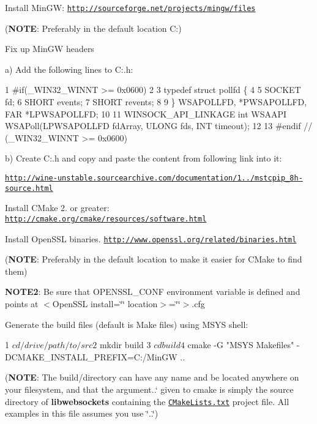 \begin{DoxyEnumerate}
\item Install Min\+GW\+: \href{http://sourceforge.net/projects/mingw/files}{\tt http\+://sourceforge.\+net/projects/mingw/files}

({\bfseries N\+O\+TE}\+: Preferably in the default location C\+:)
\item Fix up Min\+GW headers

a) Add the following lines to C\+:.h\+: 
\begin{DoxyCode}
1 #if(\_WIN32\_WINNT >= 0x0600)
2 
3 typedef struct pollfd \{
4 
5         SOCKET  fd;
6         SHORT   events;
7         SHORT   revents;
8 
9 \} WSAPOLLFD, *PWSAPOLLFD, FAR *LPWSAPOLLFD;
10 
11 WINSOCK\_API\_LINKAGE int WSAAPI WSAPoll(LPWSAPOLLFD fdArray, ULONG fds, INT timeout);
12 
13 #endif // (\_WIN32\_WINNT >= 0x0600)
\end{DoxyCode}
 b) Create C\+:.h and copy and paste the content from following link into it\+:

\href{http://wine-unstable.sourcearchive.com/documentation/1.1.32/mstcpip_8h-source.html}{\tt http\+://wine-\/unstable.\+sourcearchive.\+com/documentation/1../mstcpip\+\_\+8h-\/source.\+html}
\item Install C\+Make 2. or greater\+: \href{http://cmake.org/cmake/resources/software.html}{\tt http\+://cmake.\+org/cmake/resources/software.\+html}
\item Install Open\+S\+SL binaries. \href{http://www.openssl.org/related/binaries.html}{\tt http\+://www.\+openssl.\+org/related/binaries.\+html}

({\bfseries N\+O\+TE}\+: Preferably in the default location to make it easier for C\+Make to find them)

{\bfseries N\+O\+T\+E2}\+: Be sure that O\+P\+E\+N\+S\+S\+L\+\_\+\+C\+O\+NF environment variable is defined and points at $<$\+Open\+S\+S\+L install=\char`\"{}\char`\"{} location$>$=\char`\"{}\char`\"{}$>$.cfg
\item Generate the build files (default is Make files) using M\+S\+YS shell\+: 
\begin{DoxyCode}
1 $ cd /drive/path/to/src
2 $ mkdir build
3 $ cd build
4 $ cmake -G "MSYS Makefiles" -DCMAKE\_INSTALL\_PREFIX=C:/MinGW ..
\end{DoxyCode}
 ({\bfseries N\+O\+TE}\+: The {\ttfamily build/}{\ttfamily directory can have any name and be located anywhere on your filesystem, and that the argument}..` given to cmake is simply the source directory of {\bfseries libwebsockets} containing the \href{CMakeLists.txt}{\tt C\+Make\+Lists.\+txt} project file. All examples in this file assumes you use \char`\"{}..\char`\"{})


\end{DoxyEnumerate}
